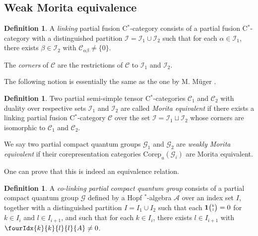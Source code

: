 \documentclass[10pt]{article}
\newcommand{\Corep}{\mathrm{Corep}}
\newcommand{\CatC}{\mathcal{C}}
\newcommand{\CatCC}{\mathscr{C}}
\newcommand{\Grt}[3]{#1{\tiny {\begin{pmatrix} #2\\#3\end{pmatrix}}}}
\newcommand{\UnitC}[2]{\Grt{\mathbf{1}}{#1}{#2}}
\newcommand{\Gr}[5]{\fourIdx{#2}{#4}{#3}{#5}{#1}}%
\theoremstyle{definition}
\newtheorem{Def}[Theorem]{Definition}
\numberwithin{equation}{section}
\begin{document}
\subsection{Weak Morita equivalence}

\begin{Def} A \emph{linking} partial fusion C$^*$-category consists of a partial fusion C$^*$-category with a distinguished partition $\mathscr{I} =\mathscr{I}_1 \cup \mathscr{I}_2$ such that for each $\alpha\in \mathscr{I}_1$, there exists $\beta \in \mathscr{I}_{2}$ with $\CatC_{\alpha\beta}\neq \{0\}$.

The \emph{corners} of $\CatCC$ are the restrictions of $\CatCC$ to $\mathscr{I}_1$ and $\mathscr{I}_2$.
\end{Def}

The following notion is essentially the same as the one by M. M\"{u}ger \cite{Mug1}. 

\begin{Def} Two partial semi-simple tensor C$^*$-categories $\CatCC_1$ and $\CatCC_2$ with duality over respective sets $\mathscr{I}_1$ and $\mathscr{I}_2$ are called \emph{Morita equivalent} if there exists a linking partial fusion C$^*$-category $\CatCC$ over the set $\mathscr{I}=\mathscr{I}_1\sqcup \mathscr{I}_2$ whose corners are isomorphic to $\CatCC_1$ and $\CatCC_2$.

We say two partial compact quantum groups $\mathscr{G}_1$ and $\mathscr{G}_2$ are \emph{weakly Morita equivalent} if their corepresentation categories $\Corep_u(\mathscr{G}_i)$ are Morita equivalent. 
\end{Def} 

One can prove that this is indeed an equivalence relation. %

\begin{Def}\label{DefCoLink} A \emph{co-linking partial compact quantum group} consists of a partial compact quantum group $\mathscr{G}$ defined by a Hopf $^*$-algebra $\mathscr{A}$ over an index set $I$, together with a distinguished partition $I = I_1\cup I_2$ such that each $\UnitC{k}{l}=0$ for $k\in I_i$ and $l\in I_{i+1}$, and such that for each $k\in I_i$, there exists $l\in I_{i+1}$ with $\Gr{A}{k}{l}{k}{l}\neq 0$.  
\end{Def} 
\end{document}
